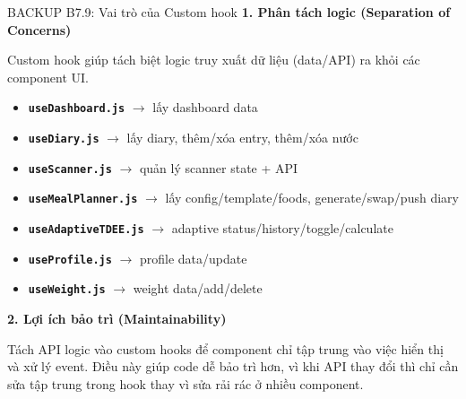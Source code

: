 \documentclass[10pt, aspectratio=169]{beamer}
\begin{document}
\begin{frame}[fragile, label=b7_9]{BACKUP B7.9: Vai trò của Custom hook}
\hypertarget{b7_9_target}{}
    \textbf{1. Phân tách logic (Separation of Concerns)}
    \vspace{0.1cm}
    
    Custom hook giúp tách biệt logic truy xuất dữ liệu (data/API) ra khỏi các component UI.
    
    \begin{itemize}
        \small \setlength{\itemsep}{1pt}
        \item \textbf{\texttt{useDashboard.js}} $\rightarrow$ lấy dashboard data
        \item \textbf{\texttt{useDiary.js}} $\rightarrow$ lấy diary, thêm/xóa entry, thêm/xóa nước
        \item \textbf{\texttt{useScanner.js}} $\rightarrow$ quản lý scanner state + API
        \item \textbf{\texttt{useMealPlanner.js}} $\rightarrow$ lấy config/template/foods, generate/swap/push diary
        \item \textbf{\texttt{useAdaptiveTDEE.js}} $\rightarrow$ adaptive status/history/toggle/calculate
        \item \textbf{\texttt{useProfile.js}} $\rightarrow$ profile data/update
        \item \textbf{\texttt{useWeight.js}} $\rightarrow$ weight data/add/delete
    \end{itemize}

    \vspace{0.2cm}
    \textbf{2. Lợi ích bảo trì (Maintainability)}
    \vspace{0.1cm}
    
    Tách API logic vào custom hooks để component chỉ tập trung vào việc hiển thị và xử lý event. Điều này giúp code dễ bảo trì hơn, vì khi API thay đổi thì chỉ cần sửa tập trung trong hook thay vì sửa rải rác ở nhiều component.
\end{frame}
\end{document}
